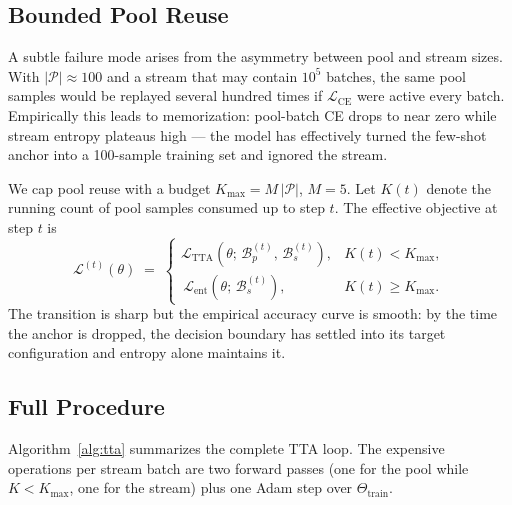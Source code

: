 \documentclass[10pt, conference, letterpaper]{IEEEtran}
\begin{document}
\subsection{Bounded Pool Reuse}
\label{sec:poolcap}

A subtle failure mode arises from the asymmetry between pool and stream sizes. With $|\mathcal{P}| \approx 100$ and a stream that may contain $10^5$ batches, the same pool samples would be replayed several hundred times if $\mathcal{L}_{\text{CE}}$ were active every batch. Empirically this leads to memorization: pool-batch CE drops to near zero while stream entropy plateaus high --- the model has effectively turned the few-shot anchor into a 100-sample training set and ignored the stream.

We cap pool reuse with a budget $K_{\max} = M\,|\mathcal{P}|$, $M = 5$. Let $K(t)$ denote the running count of pool samples consumed up to step $t$. The effective objective at step $t$ is
\begin{equation}
\label{eq:tta-eff}
\mathcal{L}^{(t)}(\theta) \;=\;
\begin{cases}
\mathcal{L}_{\text{TTA}}\!\left(\theta;\, \mathcal{B}_p^{(t)},\, \mathcal{B}_s^{(t)}\right), & K(t) < K_{\max}, \\[4pt]
\, \mathcal{L}_{\text{ent}}\!\left(\theta;\, \mathcal{B}_s^{(t)}\right), & K(t) \geq K_{\max}.
\end{cases}
\end{equation}
The transition is sharp but the empirical accuracy curve is smooth: by the time the anchor is dropped, the decision boundary has settled into its target configuration and entropy alone maintains it.

\subsection{Full Procedure}

Algorithm~\ref{alg:tta} summarizes the complete TTA loop. The expensive operations per stream batch are two forward passes (one for the pool while $K < K_{\max}$, one for the stream) plus one Adam step over $\Theta_{\text{train}}$.
\end{document}
